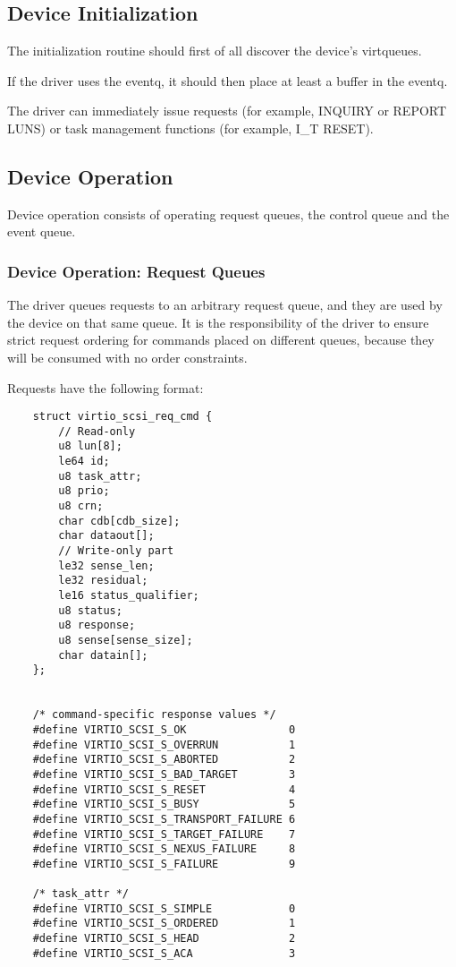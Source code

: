 \subsection{Device Initialization}\label{sec:Device Types / SCSI Host Device / Device Initialization}

The initialization routine should first of all discover the
device's virtqueues.

If the driver uses the eventq, it should then place at least a
buffer in the eventq.

The driver can immediately issue requests (for example, INQUIRY
or REPORT LUNS) or task management functions (for example, I_T
RESET).

\subsection{Device Operation}\label{sec:Device Types / SCSI Host Device / Device Operation}

Device operation consists of operating request queues, the control
queue and the event queue.

\subsubsection{Device Operation: Request Queues}\label{sec:Device Types / SCSI Host Device / Device Operation / Device Operation: Request Queues}

The driver queues requests to an arbitrary request queue, and
they are used by the device on that same queue. It is the
responsibility of the driver to ensure strict request ordering
for commands placed on different queues, because they will be
consumed with no order constraints.

Requests have the following format:

\begin{lstlisting}
	struct virtio_scsi_req_cmd {
		// Read-only
		u8 lun[8];
		le64 id;
		u8 task_attr;
		u8 prio;
		u8 crn;
		char cdb[cdb_size];
		char dataout[];
		// Write-only part
		le32 sense_len;
		le32 residual;
		le16 status_qualifier;
		u8 status;
		u8 response;
		u8 sense[sense_size];
		char datain[];
	};


	/* command-specific response values */
	#define VIRTIO_SCSI_S_OK                0
	#define VIRTIO_SCSI_S_OVERRUN           1
	#define VIRTIO_SCSI_S_ABORTED           2
	#define VIRTIO_SCSI_S_BAD_TARGET        3
	#define VIRTIO_SCSI_S_RESET             4
	#define VIRTIO_SCSI_S_BUSY              5
	#define VIRTIO_SCSI_S_TRANSPORT_FAILURE 6
	#define VIRTIO_SCSI_S_TARGET_FAILURE    7
	#define VIRTIO_SCSI_S_NEXUS_FAILURE     8
	#define VIRTIO_SCSI_S_FAILURE           9

	/* task_attr */
	#define VIRTIO_SCSI_S_SIMPLE            0
	#define VIRTIO_SCSI_S_ORDERED           1
	#define VIRTIO_SCSI_S_HEAD              2
	#define VIRTIO_SCSI_S_ACA               3
\end{lstlisting}

